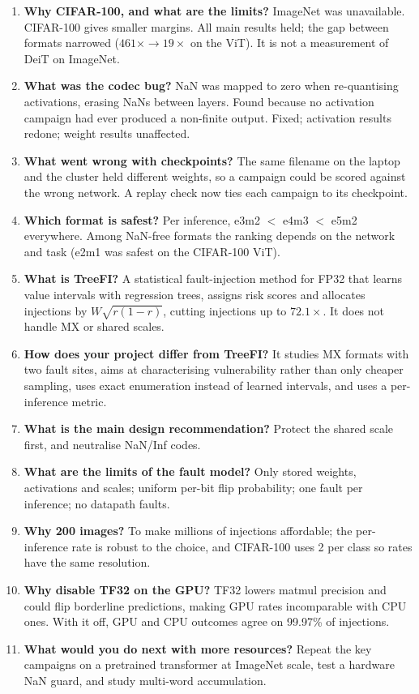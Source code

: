 \begin{enumerate}[leftmargin=0.7cm,itemsep=5pt]
\item \textbf{Why CIFAR-100, and what are the limits?} ImageNet was unavailable. CIFAR-100 gives smaller margins. All main results held; the gap between formats narrowed ($461\times\to19\times$ on the ViT). It is not a measurement of DeiT on ImageNet.
\item \textbf{What was the codec bug?} NaN was mapped to zero when re-quantising activations, erasing NaNs between layers. Found because no activation campaign had ever produced a non-finite output. Fixed; activation results redone; weight results unaffected.
\item \textbf{What went wrong with checkpoints?} The same filename on the laptop and the cluster held different weights, so a campaign could be scored against the wrong network. A replay check now ties each campaign to its checkpoint.
\item \textbf{Which format is safest?} Per inference, e3m2 $<$ e4m3 $<$ e5m2 everywhere. Among NaN-free formats the ranking depends on the network and task (e2m1 was safest on the CIFAR-100 ViT).
\item \textbf{What is TreeFI?} A statistical fault-injection method for FP32 that learns value intervals with regression trees, assigns risk scores and allocates injections by $W\sqrt{r(1-r)}$, cutting injections up to $72.1\times$. It does not handle MX or shared scales.
\item \textbf{How does your project differ from TreeFI?} It studies MX formats with two fault sites, aims at characterising vulnerability rather than only cheaper sampling, uses exact enumeration instead of learned intervals, and uses a per-inference metric.
\item \textbf{What is the main design recommendation?} Protect the shared scale first, and neutralise NaN/Inf codes.
\item \textbf{What are the limits of the fault model?} Only stored weights, activations and scales; uniform per-bit flip probability; one fault per inference; no datapath faults.
\item \textbf{Why 200 images?} To make millions of injections affordable; the per-inference rate is robust to the choice, and CIFAR-100 uses 2 per class so rates have the same resolution.
\item \textbf{Why disable TF32 on the GPU?} TF32 lowers matmul precision and could flip borderline predictions, making GPU rates incomparable with CPU ones. With it off, GPU and CPU outcomes agree on 99.97\% of injections.
\item \textbf{What would you do next with more resources?} Repeat the key campaigns on a pretrained transformer at ImageNet scale, test a hardware NaN guard, and study multi-word accumulation.

\end{enumerate}
